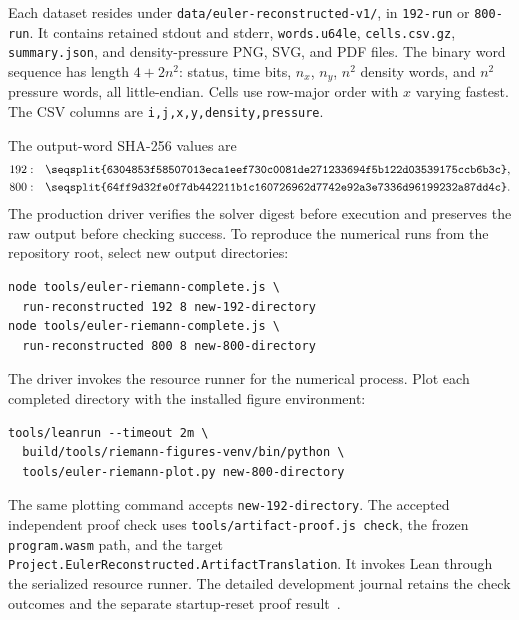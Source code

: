 \documentclass[11pt]{article}
\newcommand{\code}[1]{\texttt{#1}}
\newcommand{\longcode}[1]{\texttt{\seqsplit{#1}}}
\begin{document}
Each dataset resides under \code{data/euler-reconstructed-v1/}, in \code{192-run} or \code{800-run}.  It contains retained stdout and stderr, \code{words.u64le}, \code{cells.csv.gz}, \code{summary.json}, and density-pressure PNG, SVG, and PDF files.  The binary word sequence has length $4+2n^2$: status, time bits, $n_x$, $n_y$, $n^2$ density words, and $n^2$ pressure words, all little-endian.  Cells use row-major order with $x$ varying fastest.  The CSV columns are \code{i,j,x,y,density,pressure}.

The output-word SHA-256 values are
\begin{align*}
192:&\quad\text{\longcode{6304853f58507013eca1eef730c0081de271233694f5b122d03539175ccb6b3c}},\\
800:&\quad\text{\longcode{64ff9d32fe0f7db442211b1c160726962d7742e92a3e7336d96199232a87dd4c}}.
\end{align*}
The production driver verifies the solver digest before execution and preserves the raw output before checking success.  To reproduce the numerical runs from the repository root, select new output directories:
\begin{verbatim}
node tools/euler-riemann-complete.js \
  run-reconstructed 192 8 new-192-directory
node tools/euler-riemann-complete.js \
  run-reconstructed 800 8 new-800-directory
\end{verbatim}
The driver invokes the resource runner for the numerical process.  Plot each completed directory with the installed figure environment:
\begin{verbatim}
tools/leanrun --timeout 2m \
  build/tools/riemann-figures-venv/bin/python \
  tools/euler-riemann-plot.py new-800-directory
\end{verbatim}
The same plotting command accepts \code{new-192-directory}.  The accepted independent proof check uses \code{tools/artifact-proof.js check}, the frozen \code{program.wasm} path, and the target \code{Project.EulerReconstructed.ArtifactTranslation}.  It invokes Lean through the serialized resource runner.  The detailed development journal retains the check outcomes and the separate startup-reset proof result~\cite{journal}.
\end{document}
